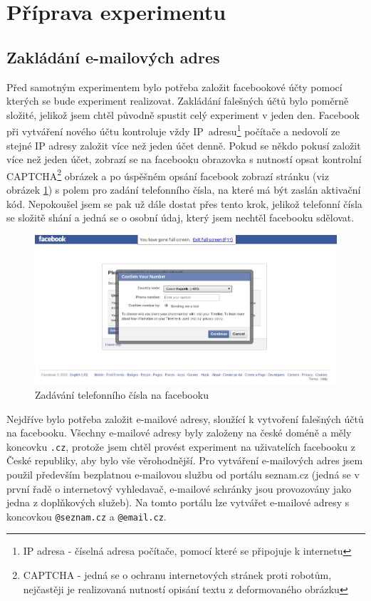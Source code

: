 \documentclass[thesis=M,czech]{FITthesis}[2013/05/10]
\begin{document}
\section{Příprava experimentu}

\subsection{Zakládání e-mailových adres}

Před samotným experimentem bylo potřeba založit facebookové účty pomocí kterých se bude experiment realizovat.
Zakládání falešných účtů bylo poměrně složité, jelikož jsem chtěl původně spustit celý experiment v jeden den. 
Facebook při vytváření nového účtu kontroluje vždy 
IP~adresu\footnote{IP adresa - číselná adresa počítače, pomocí které se připojuje k internetu} počítače a nedovolí ze stejné IP adresy založit více než jeden účet denně. 
Pokud se někdo pokusí založit více než jeden účet, zobrazí se na facebooku obrazovka s nutností opsat kontrolní 
CAPTCHA\footnote{CAPTCHA - jedná se o ochranu internetových stránek proti robotům, nejčastěji je realizovaná nutností opisání textu z deformovaného obrázku} obrázek a po úspěšném opsání facebook zobrazí stránku (viz obrázek \ref{fig:fbTelephoneNubmer}) s polem pro zadání telefonního čísla, na které má být zaslán aktivační kód.
Nepokoušel jsem se pak už dále dostat přes tento krok, jelikož telefonní čísla se složitě shání a jedná se o osobní údaj, který jsem nechtěl facebooku sdělovat.

\begin{figure}[h]
\begin{center}
\includegraphics[width=5in]{figures/fb-telephone-number2.jpg}
\caption{Zadávání telefonního čísla na facebooku}
\label{fig:fbTelephoneNubmer}
\end{center}
\end{figure}

Nejdříve bylo potřeba založit e-mailové adresy, sloužící k vytvoření falešných účtů na facebooku. 
Všechny e-mailové adresy byly založeny na české doméně a měly koncovku \verb|.cz|, protože jsem chtěl provést experiment na uživatelích facebooku z České republiky, aby bylo vše věrohodnější.
Pro vytváření e-mailových adres jsem použil především bezplatnou e-mailovou službu od portálu seznam.cz (jedná se v první řadě o internetový vyhledavač, e-mailové schránky jsou provozovány jako jedna z doplňkových služeb). 
Na tomto portálu lze vytvářet e-mailové adresy s koncovkou \verb|@seznam.cz| a \verb|@email.cz|.
\end{document}
